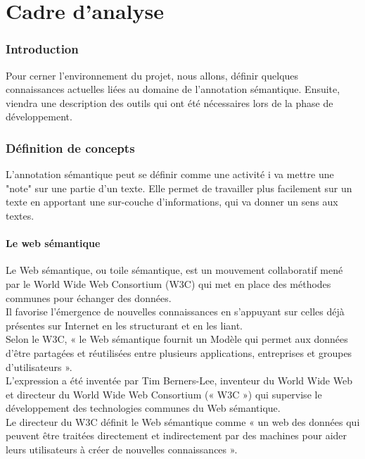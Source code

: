 \documentclass[a4paper, 11pt]{report}
\begin{document}
\part{Cadre d'analyse}
\section*{Introduction}
Pour cerner l'environnement du projet, nous allons, définir quelques connaissances actuelles liées au domaine de l'annotation sémantique. Ensuite, viendra une description des outils qui ont été nécessaires lors de la phase de développement.\\

\section{Définition de concepts}
L'annotation sémantique peut se définir comme une activité i va mettre une "note" sur une partie d'un texte. Elle permet de travailler plus facilement sur un texte en apportant une sur-couche d'informations, qui va donner un sens aux textes.
\subsection{Le web sémantique}
Le Web sémantique, ou toile sémantique, est un mouvement collaboratif mené par le World Wide Web Consortium (W3C) qui met en place des méthodes communes pour échanger des données.\\
Il favorise l'émergence de nouvelles connaissances en s'appuyant sur celles déjà présentes sur Internet en les structurant et en les liant.\\
Selon le W3C, « le Web sémantique fournit un Modèle qui permet aux données d'être partagées et réutilisées entre plusieurs applications, entreprises et groupes d'utilisateurs ».\\
L'expression a été inventée par Tim Berners-Lee, inventeur du World Wide Web et directeur du World Wide Web Consortium (« W3C ») qui supervise le développement des technologies communes du Web sémantique. \\
Le directeur du W3C définit le Web sémantique comme « un web des données qui peuvent être traitées directement et indirectement par des machines pour aider leurs utilisateurs à créer de nouvelles connaissances ».
\end{document}

